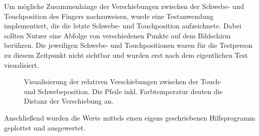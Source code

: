\documentclass[a4paper,12pt,bibliography=totoc]{scrreprt}%
\begin{document}
Um mögliche Zusammenhänge der Verschiebungen zwischen der Schwebe- und Touchposition des Fingers nachzuweisen, wurde eine Testanwendung implementiert, die die letzte Schwebe- und Touchposition aufzeichnete. Dabei sollten Nutzer eine Abfolge von verschiedenen Punkte auf dem Bildschirm berühren. Die jeweiligen Schwebe- und Touchpositionen waren für die Testperson zu diesem Zeitpunkt nicht sichtbar und wurden erst nach dem eigentlichen Test visualisiert.
\begin{figure}
\centering
{}
\hfill
{}
\caption{Visualisierung der relativen Verschiebungen zwischen der Touch- und Schwebeposition. Die Pfeile inkl. Farbtemperatur deuten die Distanz der Verschiebung an.}
\label{klickschwebepositionen}
\end{figure}
Anschließend wurden die Werte mittels einen eigens geschriebenen Hilfsprogramm geplottet und ausgewertet.
\end{document}
